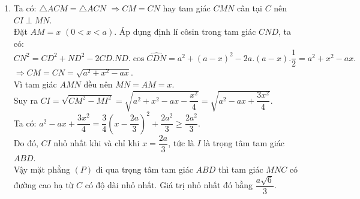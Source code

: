 \begin{bt}
{\begin{enumerate}
			$ABCD$ là tứ diện đều nên $ABD$ là tam giác đều. Do $MN \parallel BD$ nên $AMN$ là tam giác đều.\\
			Gọi $I$, $H$ lần lượt là trung điểm của $MN$, $BD$ $\Rightarrow I \in AH$.\\
			Vì $G$ là trọng tâm tam giác $MNC$ nên $\overrightarrow{CG}=\dfrac{2}{3}\overrightarrow{CI}$. Do đó, $G$ là ảnh của $I$ qua phép vị tự tâm $C$, tỉ số $\dfrac{2}{3}$.
			Do $I$ di động trên đoạn thẳng $AH$ nên gọi $J$, $K$ lần lượt là ảnh của $A$, $H$ qua phép vị tự tâm $C$, tỉ số $\dfrac{2}{3}$, ta có $G$ di động trên đoạn thẳng $JK$.\\
			Vậy tập hợp trọng tâm $G$ của tam giác $MNC$ là đoạn thẳng $JK$ (không kể điểm $J$) là ảnh của đoạn thẳng $AH$ qua phép vị tự tâm $C$, tỉ số $\dfrac{2}{3}$.
			\item Ta có: $\triangle ACM = \triangle ACN$ $\Rightarrow CM=CN$ hay tam giác $CMN$ cân tại $C$ nên $CI \perp MN$.\\
			Đặt $AM=x$ $(0<x<a)$. Áp dụng định lí côsin trong tam giác $CND$, ta có:$$CN^2=CD^2+ND^2-2CD.ND.\cos \widehat{CDN}=a^2+(a-x)^2-2a.(a-x).\dfrac{1}{2}=a^2+x^2-ax.$$
			$\Rightarrow CM=CN=\sqrt{a^2+x^2-ax}$.\\
			Vì tam giác $AMN$ đều nên $MN=AM=x$.\\
			Suy ra $CI=\sqrt{CM^2-MI^2}=\sqrt{a^2+x^2-ax-\dfrac{x^2}{4}}=\sqrt{a^2-ax+\dfrac{3x^2}{4}}$.\\
			Ta có: $a^2-ax+\dfrac{3x^2}{4}=\dfrac{3}{4}\left(x-\dfrac{2a}{3}\right)^2+\dfrac{2a^2}{3}\geq \dfrac{2a^2}{3}$.\\
			Do đó, $CI$ nhỏ nhất khi và chỉ khi $x=\dfrac{2a}{3}$, tức là $I$ là trọng tâm tam giác $ABD$.\\
			Vậy mặt phẳng $(P)$ đi qua trọng tâm tam giác $ABD$ thì tam giác $MNC$ có đường cao hạ từ $C$ có độ dài nhỏ nhất. Giá trị nhỏ nhất đó bằng $\dfrac{a\sqrt{6}}{3}$.
		\end{enumerate}
	}
\end{bt}


